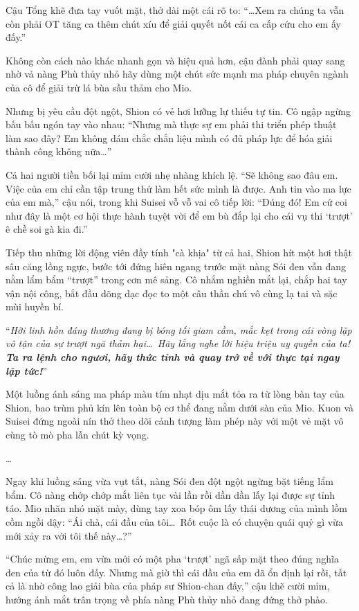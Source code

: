 \documentclass[../main.tex]{subfiles}
\begin{document}
Cậu Tổng khẽ đưa tay vuốt mặt, thở dài một cái rõ to: ``\dots Xem ra chúng ta vẫn còn phải OT tăng ca thêm chút xíu để giải quyết nốt cái ca cấp cứu cho em ấy đấy.''

Không còn cách nào khác nhanh gọn và hiệu quả hơn, cậu đành phải quay sang nhờ vả nàng Phù thủy nhỏ hãy dùng một chút sức mạnh ma pháp chuyên ngành của cô để giải trừ lá bùa sầu thảm cho Mio.

Nhưng bị yêu cầu đột ngột, Shion có vẻ hơi lưỡng lự thiếu tự tin. Cô ngập ngừng bấu bấu ngón tay vào nhau: ``Nhưng mà thực sự em phải thi triển phép thuật làm sao đây? Em không dám chắc chắn liệu mình có đủ pháp lực để hóa giải thành công không nữa\dots''

Cả hai người tiền bối lại mỉm cười nhẹ nhàng khích lệ. ``Sẽ không sao đâu em. Việc của em chỉ cần tập trung thử làm hết sức mình là được. Anh tin vào ma lực của em mà,'' cậu nói, trong khi Suisei vỗ vỗ vai cô tiếp lời: ``Đúng đó! Em cứ coi như đây là một cơ hội thực hành tuyệt vời để em bù đắp lại cho cái vụ thi `trượt' ê chề soi gà kia đi.''

Tiếp thu những lời động viên đầy tính "cà khịa" từ cả hai, Shion hít một hơi thật sâu căng lồng ngực, bước tới đứng hiên ngang trước mặt nàng Sói đen vẫn đang nằm lẩm bẩm ``trượt'' trong cơn mê sảng. Cô nhắm nghiền mắt lại, chắp hai tay vận nội công, bắt đầu dõng dạc đọc to một câu thần chú vô cùng lạ tai và sặc mùi huyền bí.

``\textit{Hỡi linh hồn đáng thương đang bị bóng tối giam cầm, mắc kẹt trong cái vòng lặp vô tận của sự trượt ngã thảm hại\dots\ Hãy lắng nghe lời hiệu triệu uy quyền của ta! \textbf{Ta ra lệnh cho ngươi, hãy thức tỉnh và quay trở về với thực tại ngay lập tức!}}''

Một luồng ánh sáng ma pháp màu tím nhạt dịu mắt tỏa ra từ lòng bàn tay của Shion, bao trùm phủ kín lên toàn bộ cơ thể đang nằm dưới sàn của Mio. Kuon và Suisei đứng ngoài nín thở theo dõi cảnh tượng làm phép này với một vẻ mặt vô cùng tò mò pha lẫn chút kỳ vọng.

\dots

Ngay khi luồng sáng vừa vụt tắt, nàng Sói đen đột ngột ngừng bặt tiếng lẩm bẩm. Cô nàng chớp chớp mắt liên tục vài lần rồi dần dần lấy lại được sự tỉnh táo. Mio nhăn nhó mặt mày, dùng tay xoa bóp ôm lấy thái dương của mình lồm cồm ngồi dậy: ``Ái chà, cái đầu của tôi\dots\ Rốt cuộc là có chuyện quái quỷ gì vừa mới xảy ra với tôi thế này\dots?''

``Chúc mừng em, em vừa mới có một pha `trượt' ngã sấp mặt theo đúng nghĩa đen của từ đó luôn đấy. Nhưng mà giờ thì cái đầu của em đã ổn định lại rồi, tất cả là nhờ công lao giải bùa của pháp sư Shion-chan đấy,'' cậu khẽ cười mỉm, hướng ánh mắt trân trọng về phía nàng Phù thủy nhỏ đang đứng thở phào.
\end{document}
